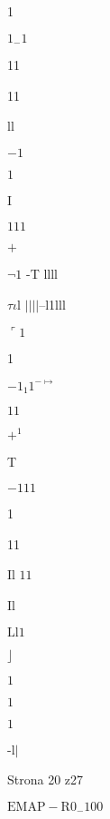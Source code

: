 \documentclass[a4paper,12pt]{article}
\begin{document}
1

$1_{-}1$

11

11

ll

$-1$

$1$

I

$111$

$+$

$\neg 1$ -T llll

$\tau \iota$l $|| | |$--l1lll

$\ulcorner 1$

1

$-1_{1}1^{-\mapsto}$

$11$

$+^{1}$

T

$-111$

1

11

Il $1 1$

Il

$\mathrm{L}\mathrm{l}1$

$\rfloor$

$1$

$1$

$1$

-l$|$

Strona 20 z27

$\mathrm{E}\mathrm{M}\mathrm{A}\mathrm{P}-\mathrm{R}0_{-}100$
\end{document}
